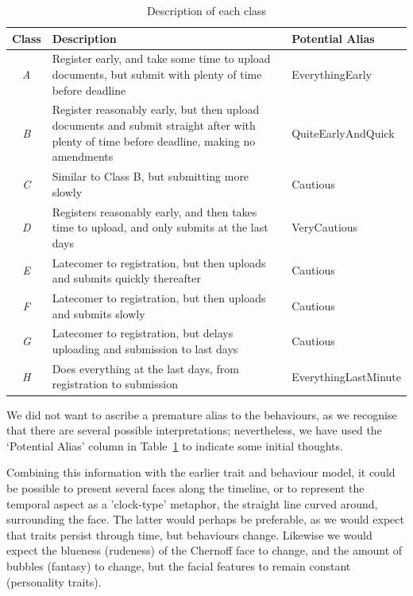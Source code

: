 \documentclass{AISB2008}
\begin{document}
\begin{table}
\centering
\begin{tabularx}{\textwidth}{c X l}
\hline
Class & Description & Potential Alias  \\ 
\hline
{\emph{A}} & Register early, and take some time to upload documents, but submit with plenty of time before deadline & EverythingEarly\\
{\emph{B}} & Register reasonably early, but then upload documents and submit straight after with plenty of time before deadline, making no amendments & QuiteEarlyAndQuick\\
{\emph{C}} & Similar to Class B, but submitting more slowly & Cautious\\
{\emph{D}} & Registers reasonably early, and then takes time to upload, and only submits at the last days & VeryCautious\\
{\emph{E}} & Latecomer to registration, but then uploads and submits
quickly thereafter & Cautious\\
{\emph{F}} & Latecomer to registration, but then uploads and submits
slowly & Cautious\\
{\emph{G}} & Latecomer to registration, but delays uploading and
submission to last days & Cautious\\
{\emph{H}} & Does everything at the last days, from registration to submission & EverythingLastMinute\\
\hline
\end{tabularx}
\caption{Description of each class}
\label{tbl:classdesc}
\end{table}

We did not want to ascribe a premature alias to the behaviours, as we
recognise that there are several possible interpretations;
nevertheless, we have used the `Potential Alias' column in
Table~\ref{tbl:classdesc} to indicate some initial thoughts.

Combining this information with the earlier trait and behaviour model,
it could be possible to present several faces along the timeline, or
to represent the temporal aspect as a 'clock-type' metaphor, the
straight line curved around, surrounding the face.  The latter would
perhaps be preferable, as we would expect that traits persist through
time, but behaviours change. Likewise we would expect the blueness
(rudeness) of the Chernoff face to change, and the amount of bubbles
(fantasy) to change, but the facial features to remain constant
(personality traits).
\end{document}
